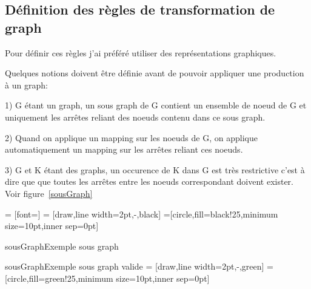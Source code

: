 \documentclass[a4paper, 12pt]{article}
\begin{document}
\subsection{Définition des règles de transformation de graph}

Pour définir ces règles j'ai préféré utiliser des représentations graphiques.

Quelques notions doivent être définie avant de pouvoir appliquer une production à un graph:

1) G étant un graph, un sous graph de G contient un ensemble de noeud de G et uniquement les arrêtes reliant des noeuds contenu dans ce sous graph. 

2) Quand on applique un mapping sur les noeuds de G, on applique automatiquement un mapping sur les arrêtes reliant ces noeuds.

3) G et K étant des graphs, un occurence de K dans G est très restrictive c'est à dire que que toutes les arrêtes entre les noeuds correspondant doivent exister. 
Voir figure~\ref{sousGraph} 

 = [font=\small]
 = [draw,line width=2pt,-,black]
=[circle,fill=black!25,minimum size=10pt,inner sep=0pt]
\begin{myfig}{sousGraph}{Exemple sous graph}
\end{myfig}



\begin{myfig}{sousGraph}{Exemple sous graph valide}
 = [draw,line width=2pt,-,green]
=[circle,fill=green!25,minimum size=10pt,inner sep=0pt]
\end{myfig}
\end{document}
